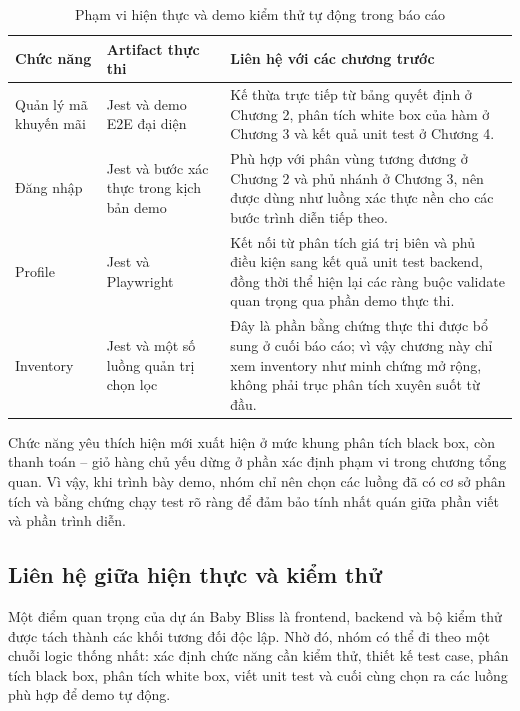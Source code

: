 \begin{table}[H]
	\centering
	\small
	\renewcommand{\arraystretch}{1.25}
	\begin{tabularx}{\textwidth}{|>{\raggedright\arraybackslash}p{3.8cm}|>{\raggedright\arraybackslash}p{3.0cm}|>{\raggedright\arraybackslash}X|}
		\hline
		\textbf{Chức năng}    & \textbf{Artifact thực thi}                & \textbf{Liên hệ với các chương trước}                                                                                                                                 \\
		\hline
		Quản lý mã khuyến mãi & Jest và demo E2E đại diện                 & Kế thừa trực tiếp từ bảng quyết định ở Chương 2, phân tích white box của hàm \code{validateCoupon} ở Chương 3 và kết quả unit test ở Chương 4.                      \\
		\hline
		Đăng nhập             & Jest và bước xác thực trong kịch bản demo & Phù hợp với phân vùng tương đương ở Chương 2 và phủ nhánh ở Chương 3, nên được dùng như luồng xác thực nền cho các bước trình diễn tiếp theo.                         \\
		\hline
		Profile               & Jest và Playwright                        & Kết nối từ phân tích giá trị biên và phủ điều kiện sang kết quả unit test backend, đồng thời thể hiện lại các ràng buộc validate quan trọng qua phần demo thực thi. \\
		\hline
		Inventory             & Jest và một số luồng quản trị chọn lọc    & Đây là phần bằng chứng thực thi được bổ sung ở cuối báo cáo; vì vậy chương này chỉ xem inventory như minh chứng mở rộng, không phải trục phân tích xuyên suốt từ đầu. \\
		\hline
	\end{tabularx}
	\caption{Phạm vi hiện thực và demo kiểm thử tự động trong báo cáo}
\end{table}

Chức năng yêu thích hiện mới xuất hiện ở mức khung phân tích black box, còn thanh toán -- giỏ hàng chủ yếu dừng ở phần xác định phạm vi trong chương tổng quan. Vì vậy, khi trình bày demo, nhóm chỉ nên chọn các luồng đã có cơ sở phân tích và bằng chứng chạy test rõ ràng để đảm bảo tính nhất quán giữa phần viết và phần trình diễn.

\subsection{Liên hệ giữa hiện thực và kiểm thử}
Một điểm quan trọng của dự án Baby Bliss là frontend, backend và bộ kiểm thử được tách thành các khối tương đối độc lập. Nhờ đó, nhóm có thể đi theo một chuỗi logic thống nhất: xác định chức năng cần kiểm thử, thiết kế test case, phân tích black box, phân tích white box, viết unit test và cuối cùng chọn ra các luồng phù hợp để demo tự động.

